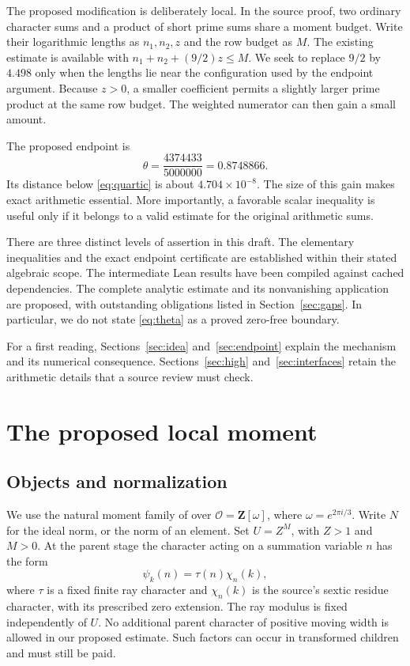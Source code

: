 \documentclass[11pt]{article}
\theoremstyle{definition}
\newcommand{\Z}{\mathbf Z}
\newcommand{\OO}{\mathcal O}
\begin{document}
The proposed modification is deliberately local. In the source proof,
two ordinary character sums and a product of short prime sums share a
moment budget. Write their logarithmic lengths as $n_1,n_2,z$ and the
row budget as $M$. The existing estimate is available with
$n_1+n_2+(9/2)z\le M$. We seek to replace $9/2$ by $4.498$ only when
the lengths lie near the configuration used by the endpoint argument.
Because $z>0$, a smaller coefficient permits a slightly larger prime
product at the same row budget. The weighted numerator can then gain a
small amount.

The proposed endpoint is
\begin{equation}\label{eq:theta}
 \theta=\frac{4374433}{5000000}=0.8748866.
\end{equation}
Its distance below \eqref{eq:quartic} is about $4.704\times10^{-8}$.
The size of this gain makes exact arithmetic essential. More
importantly, a favorable scalar inequality is useful only if it belongs
to a valid estimate for the original arithmetic sums.

There are three distinct levels of assertion in this draft. The
elementary inequalities and the exact endpoint certificate are established
within their stated algebraic scope. The intermediate Lean results have
been compiled against cached dependencies. The complete analytic estimate
and its nonvanishing application are proposed, with outstanding
obligations listed in Section~\ref{sec:gaps}. In particular, we do not
state \eqref{eq:theta} as a proved zero-free boundary.

For a first reading, Sections~\ref{sec:idea} and~\ref{sec:endpoint} explain
the mechanism and its numerical consequence. Sections~\ref{sec:high}
and~\ref{sec:interfaces} retain the arithmetic details that a source
review must check.

\section{The proposed local moment}\label{sec:moment}

\subsection{Objects and normalization}
We use the natural moment family of \cite[Appendix B3.4]{collet} over
$\OO=\Z[\omega]$, where $\omega=e^{2\pi i/3}$. Write $N$ for the
ideal norm, or the norm of an element. Set $U=Z^M$, with $Z>1$ and
$M>0$. At the parent stage the character acting on a summation variable
$n$ has the form
\[
 \psi_k(n)=\tau(n)\chi_n(k),
\]
where $\tau$ is a fixed finite ray character and $\chi_n(k)$ is the
source's sextic residue character, with its prescribed zero extension.
The ray modulus is fixed independently of $U$. No additional parent
character of positive moving width is allowed in our proposed estimate.
Such factors can occur in transformed children and must still be paid.
\end{document}
